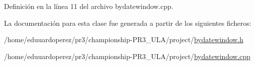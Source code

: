 Definición en la línea 11 del archivo bydatewindow.\+cpp.



La documentación para esta clase fue generada a partir de los siguientes ficheros\+:\begin{DoxyCompactItemize}
\item 
/home/eduuardoperez/pr3/championship-\/\+P\+R3\+\_\+\+U\+L\+A/project/\hyperlink{bydatewindow_8h}{bydatewindow.\+h}\item 
/home/eduuardoperez/pr3/championship-\/\+P\+R3\+\_\+\+U\+L\+A/project/\hyperlink{bydatewindow_8cpp}{bydatewindow.\+cpp}\end{DoxyCompactItemize}
